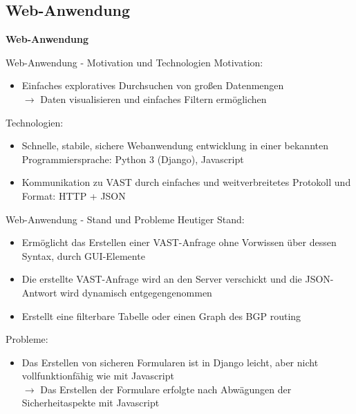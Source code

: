 \documentclass[9pt]{beamer}
\begin{document}
\subsection{Web-Anwendung}

	\begin{frame}{}
		\begin{center}
			\LARGE \textbf{Web-Anwendung}
		\end{center}
	\end{frame}

\begin{frame}{Web-Anwendung - Motivation und Technologien}{}
	Motivation:
	\begin{itemize}
		\item Einfaches exploratives Durchsuchen von großen Datenmengen\\
			$\rightarrow$ Daten visualisieren und einfaches Filtern ermöglichen
	\end{itemize}
	Technologien:
	\begin{itemize}
		\item Schnelle, stabile, sichere Webanwendung entwicklung in einer bekannten Programmiersprache:  Python 3 (Django), Javascript			
		\item Kommunikation zu VAST durch einfaches  und weitverbreitetes Protokoll und Format: HTTP + JSON
	\end{itemize}
\end{frame}

\begin{frame}{Web-Anwendung - Stand und Probleme}
	Heutiger Stand:
	\begin{itemize}
		\item Ermöglicht das Erstellen einer VAST-Anfrage ohne Vorwissen über dessen Syntax, durch GUI-Elemente 
		\item Die erstellte VAST-Anfrage wird an den Server verschickt und  die JSON-Antwort wird dynamisch entgegengenommen 
		\item Erstellt eine filterbare Tabelle oder einen Graph des BGP routing
	\end{itemize}
	Probleme:
	\begin{itemize}
		\item Das Erstellen von sicheren Formularen ist in Django leicht, aber nicht vollfunktionfähig wie mit Javascript \\
		$\rightarrow$ Das Erstellen der Formulare erfolgte nach Abwägungen der Sicherheitaspekte mit Javascript
	\end{itemize}
\end{frame}
\end{document}

